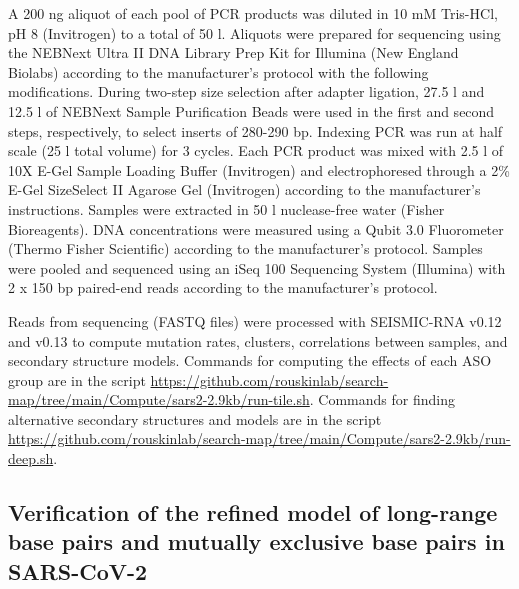 \documentclass[main.tex]{subfiles}
\begin{document}
A 200 ng aliquot of each pool of PCR products was diluted in 10 mM Tris-HCl, pH 8 (Invitrogen) to a total of 50 \textmu l.
Aliquots were prepared for sequencing using the NEBNext Ultra II DNA Library Prep Kit for Illumina (New England Biolabs) according to the manufacturer's protocol with the following modifications.
During two-step size selection after adapter ligation, 27.5 \textmu l and 12.5 \textmu l of NEBNext Sample Purification Beads were used in the first and second steps, respectively, to select inserts of 280-290 bp.
Indexing PCR was run at half scale (25 \textmu l total volume) for 3 cycles.
Each PCR product was mixed with 2.5 \textmu l of 10X E-Gel Sample Loading Buffer (Invitrogen) and electrophoresed through a 2\% E-Gel SizeSelect II Agarose Gel (Invitrogen) according to the manufacturer's instructions.
Samples were extracted in 50 \textmu l nuclease-free water (Fisher Bioreagents).
DNA concentrations were measured using a Qubit 3.0 Fluorometer (Thermo Fisher Scientific) according to the manufacturer's protocol.
Samples were pooled and sequenced using an iSeq 100 Sequencing System (Illumina) with 2 x 150 bp paired-end reads according to the manufacturer's protocol.

Reads from sequencing (FASTQ files) were processed with SEISMIC-RNA v0.12 and v0.13 to compute mutation rates, clusters, correlations between samples, and secondary structure models.
Commands for computing the effects of each ASO group are in the script \url{https://github.com/rouskinlab/search-map/tree/main/Compute/sars2-2.9kb/run-tile.sh}.
Commands for finding alternative secondary structures and models are in the script \url{https://github.com/rouskinlab/search-map/tree/main/Compute/sars2-2.9kb/run-deep.sh}.


\subsection{Verification of the refined model of long-range base pairs and mutually exclusive base pairs in SARS-CoV-2}
\end{document}
